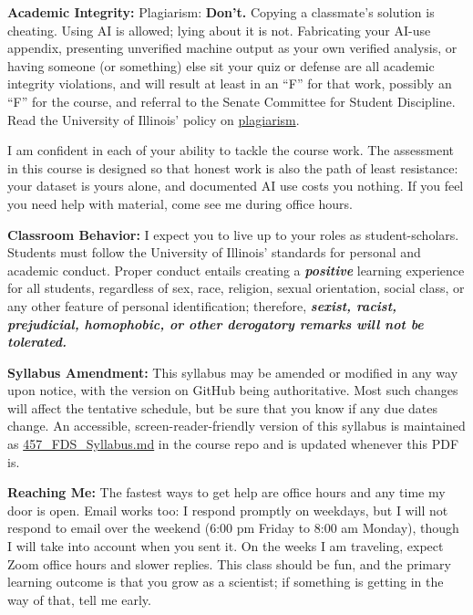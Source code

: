 {\bf \headerfont \color{RoyalBlue} Academic Integrity:}
Plagiarism: {\bf \color{Red} Don't.} Copying a
classmate's solution is cheating. Using AI is allowed; lying about
it is not. Fabricating your AI-use appendix, presenting unverified machine output as
your own verified analysis, or having someone (or something) else sit your
quiz or defense are all academic integrity violations, and will result at
least in an ``{\color{Red}F}'' for that work, possibly an ``{\color{Red}F}''
for the course, and referral to the Senate Committee for Student Discipline.
Read the University of Illinois' policy on
\href{https://studentcode.illinois.edu/article1/part4/1-402/}{plagiarism}.

I am confident in each of your ability to tackle the course work. The
assessment in this course is designed so that honest work is also the path of
least resistance: your dataset is yours alone, and documented AI use costs you nothing. If
you feel you need help with material, come see me during office hours.
\medskip

{\bf \headerfont \color{RoyalBlue} Classroom Behavior:}
I expect you to live up to your roles as student-scholars. Students must follow
the University of Illinois' standards for personal and academic conduct.
Proper conduct entails creating a \emph{\bf \color{ForestGreen}positive}
learning experience for all students, regardless of sex, race, religion, sexual
orientation, social class, or any other feature of personal identification;
therefore, \emph{\bf \color{Red} sexist, racist, prejudicial, homophobic, or
other derogatory remarks will not be tolerated.}
\medskip

{\bf \headerfont \color{RoyalBlue} Syllabus Amendment:}
This syllabus may be amended or modified in any way upon notice, with the
version on GitHub being authoritative. Most such changes will affect the
tentative schedule, but be sure that you know if any due dates change.
An accessible, screen-reader-friendly version of this syllabus is maintained
as \href{https://github.com/gnarayan/ast457_2026_Fall/blob/main/457_FDS_Syllabus.md}{457\_FDS\_Syllabus.md}
in the course repo and is updated whenever this PDF is.
\medskip

{\bf \headerfont \color{RoyalBlue} Reaching Me:}
The fastest ways to get help are office hours and any time my door is open.
Email works too: I respond promptly on weekdays, but I will not respond to
email over the weekend (6:00 pm Friday to 8:00 am Monday), though I will take
into account when you sent it. On the weeks I am traveling, expect Zoom office
hours and slower replies. This class should be fun, and the primary learning
outcome is that you grow as a scientist; if something is getting in the way of
that, tell me early.
\medskip

